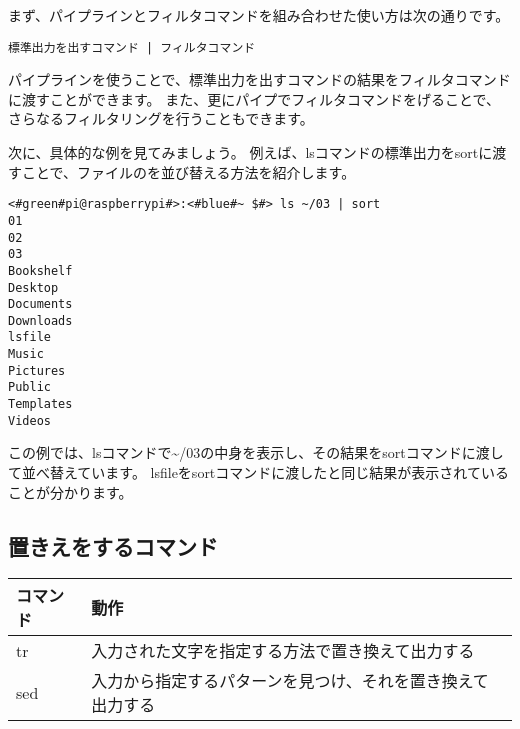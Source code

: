 まず、パイプラインとフィルタコマンドを組み合わせた使い方は次の通りです。

\begin{lstlisting}[caption=パイプラインを用いたフィルタコマンドの実行例, label=pipeline_filter]
標準出力を出すコマンド | フィルタコマンド
\end{lstlisting}

パイプラインを使うことで、標準出力を出すコマンドの結果をフィルタコマンドに渡すことができます。
また、更にパイプでフィルタコマンドをげることで、さらなるフィルタリングを行うこともできます。

次に、具体的な例を見てみましょう。
例えば、lsコマンドの標準出力をsortに渡すことで、ファイルのを並び替える方法を紹介します。

\begin{lstlisting}[caption=パイプラインを用いたsortコマンドの実行例, label=sort_example]
<#green#pi@raspberrypi#>:<#blue#~ $#> ls ~/03 | sort
01
02
03
Bookshelf
Desktop
Documents
Downloads
lsfile
Music
Pictures
Public
Templates
Videos
\end{lstlisting}

この例では、lsコマンドで\textasciitilde/03の中身を表示し、その結果をsortコマンドに渡して並べ替えています。
lsfileをsortコマンドに渡したと同じ結果が表示されていることが分かります。

\begin{tcolorbox}[title=\useOmetoi]
    \begin{enumerate}
    \end{enumerate}
\end{tcolorbox}

\subsection{置きえをするコマンド}
\begin{tabular}{ll}
    コマンド & 動作                                                       \\ \hline
    tr       & 入力された文字を指定する方法で置き換えて出力する           \\
    sed      & 入力から指定するパターンを見つけ、それを置き換えて出力する \\ \hline
\end{tabular}

